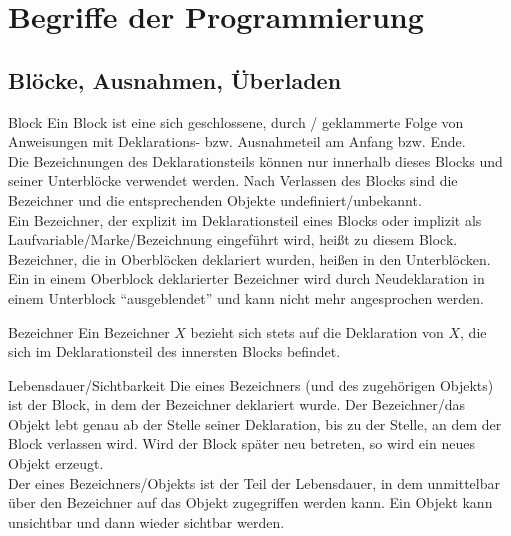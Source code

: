 \section{%
    Begriffe der Programmierung%
}

\subsection{%
    Blöcke, Ausnahmen, Überladen%
}

\begin{Def}{Block}
    Ein Block ist eine sich geschlossene, durch /
    geklammerte Folge von Anweisungen mit Deklarations- bzw. Ausnahmeteil
    am Anfang bzw. Ende. \\
    Die Bezeichnungen des Deklarationsteils können nur innerhalb dieses
    Blocks und seiner Unterblöcke verwendet werden.
    Nach Verlassen des Blocks sind die Bezeichner und die entsprechenden
    Objekte undefiniert/unbekannt. \\
    Ein Bezeichner, der explizit im Deklarationsteil eines Blocks oder implizit
    als Laufvariable/Marke/Bezeichnung eingeführt wird, heißt 
    zu diesem Block.
    Bezeichner, die in Oberblöcken deklariert wurden, heißen 
    in den Unterblöcken. \\
    Ein in einem Oberblock deklarierter Bezeichner wird durch Neudeklaration
    in einem Unterblock "`ausgeblendet"' und kann nicht mehr angesprochen
    werden.
\end{Def}

\begin{Def}{Bezeichner}
    Ein Bezeichner $X$ bezieht sich stets auf die Deklaration von $X$,
    die sich im Deklarationsteil des innersten Blocks befindet.
\end{Def}

\begin{Def}{Lebensdauer/Sichtbarkeit}
    Die  eines Bezeichners (und des zugehörigen Objekts)
    ist der Block, in dem der Bezeichner deklariert wurde.
    Der Bezeichner/das Objekt lebt genau ab der Stelle seiner Deklaration,
    bis zu der Stelle, an dem der Block verlassen wird.
    Wird der Block später neu betreten, so wird ein neues Objekt erzeugt. \\
    Der  eines Bezeichners/Objekts
    ist der Teil der Lebensdauer, in dem unmittelbar über den Bezeichner
    auf das Objekt zugegriffen werden kann.
    Ein Objekt kann unsichtbar und dann wieder sichtbar werden.
\end{Def}

